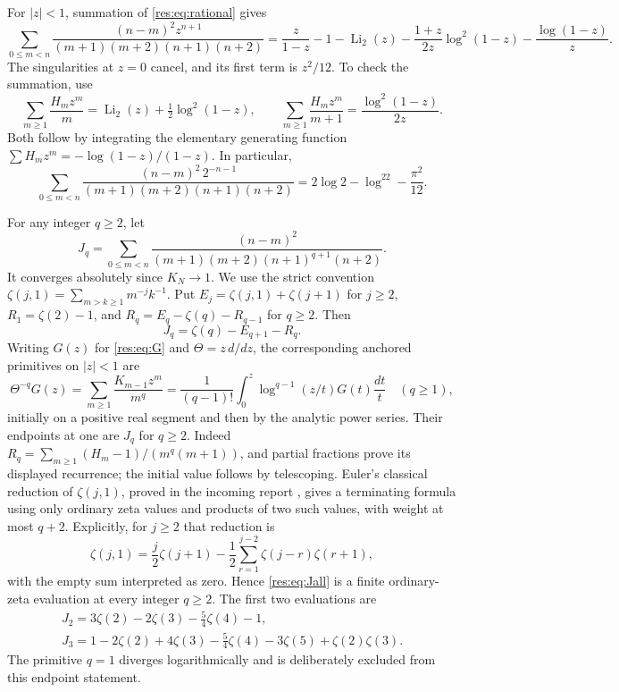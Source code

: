 \documentclass[11pt,letterpaper]{article}
\numberwithin{equation}{section}
\theoremstyle{plain}
\theoremstyle{definition}
\theoremstyle{remark}
\begin{document}
For $|z|<1$, summation of \eqref{res:eq:rational} gives
\begin{equation}
 \boxed{\sum_{0\leq m<n}
   \frac{(n-m)^2z^{n+1}}{(m+1)(m+2)(n+1)(n+2)}
 =\frac{z}{1-z}-1-\operatorname{Li}_2(z)
  -\frac{1+z}{2z}\log^2(1-z)-\frac{\log(1-z)}z.}
 \label{res:eq:G}
\end{equation}
The singularities at $z=0$ cancel, and its first term is $z^2/12$.
To check the summation, use
\[
 \sum_{m\geq1}\frac{H_mz^m}{m}
   =\operatorname{Li}_2(z)+\tfrac12\log^2(1-z),\qquad
 \sum_{m\geq1}\frac{H_mz^m}{m+1}
   =\frac{\log^2(1-z)}{2z}.
\]
Both follow by integrating the elementary generating function
$\sum H_mz^m=-\log(1-z)/(1-z)$.
In particular,
\begin{equation}
 \sum_{0\leq m<n}\frac{(n-m)^2\,2^{-n-1}}
 {(m+1)(m+2)(n+1)(n+2)}
 =2\log2-\log^22-\frac{\pi^2}{12}.\label{res:eq:half}
\end{equation}

For any integer $q\geq2$, let
\[
 J_q=\sum_{0\leq m<n}\frac{(n-m)^2}
 {(m+1)(m+2)(n+1)^{q+1}(n+2)}.
\]
It converges absolutely since $K_N\to1$.  We use the strict convention
$\zeta(j,1)=\sum_{m>k\geq1}m^{-j}k^{-1}$.  Put
$E_j=\zeta(j,1)+\zeta(j+1)$ for $j\geq2$,
$R_1=\zeta(2)-1$, and
$R_q=E_q-\zeta(q)-R_{q-1}$ for $q\geq2$.  Then
\begin{equation}
 J_q=\zeta(q)-E_{q+1}-R_q.\label{res:eq:Jall}
\end{equation}
Writing $G(z)$ for \eqref{res:eq:G} and $\Theta=z\,d/dz$, the
corresponding anchored primitives on $|z|<1$ are
\[
 \Theta^{-q}G(z)=\sum_{m\geq1}\frac{K_{m-1}z^m}{m^q}
  =\frac1{(q-1)!}\int_0^z\log^{q-1}(z/t)G(t)\frac{dt}{t}
       \quad(q\geq1),
\]
initially on a positive real segment and then by the analytic power
series.  Their endpoints at one are $J_q$ for $q\geq2$.
Indeed $R_q=\sum_{m\geq1}(H_m-1)/(m^q(m+1))$, and partial
fractions prove its displayed recurrence; the initial value follows
by telescoping.  Euler's classical reduction of $\zeta(j,1)$,
proved in the incoming report \cite[Section 6]{DHR}, gives
a terminating formula using only ordinary zeta values and products
of two such values, with weight at most $q+2$.
Explicitly, for $j\ge2$ that reduction is
\[
 \zeta(j,1)=\frac j2\zeta(j+1)
       -\frac12\sum_{r=1}^{j-2}\zeta(j-r)\zeta(r+1),
\]
with the empty sum interpreted as zero. Hence
\eqref{res:eq:Jall} is a finite ordinary-zeta evaluation at every
integer $q\ge2$.
The first two evaluations are
\begin{align}
 \boxed{J_2=3\zeta(2)-2\zeta(3)-\tfrac54\zeta(4)-1,}
 \label{res:eq:J2}\\
 J_3=1-2\zeta(2)+4\zeta(3)-\tfrac54\zeta(4)
                         -3\zeta(5)+\zeta(2)\zeta(3).
 \label{res:eq:J3}
\end{align}
The primitive $q=1$ diverges logarithmically and is deliberately
excluded from this endpoint statement.
\end{document}
